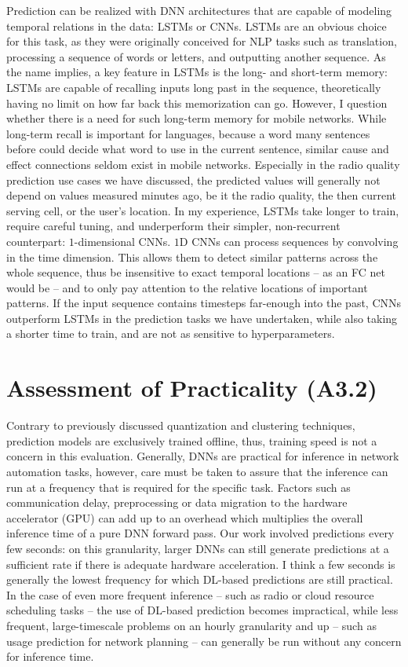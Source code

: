 		Prediction can be realized with \ac{DNN} architectures that are capable of modeling temporal relations in the data: \acp{LSTM} or \acp{CNN}.
		\acp{LSTM} are an obvious choice for this task, as they were originally conceived for \ac{NLP} tasks such as translation, processing a sequence of words or letters, and outputting another sequence.
		As the name implies, a key feature in \acp{LSTM} is the long- and short-term memory: \acp{LSTM} are capable of recalling inputs long past in the sequence, theoretically having no limit on how far back this memorization can go.
		However, I question whether there is a need for such long-term memory for mobile networks.
		While long-term recall is important for languages, because a word many sentences before could decide what word to use in the current sentence, similar cause and effect connections seldom exist in mobile networks.
		Especially in the radio quality prediction use cases we have discussed, the predicted values will generally not depend on values measured minutes ago, be it the radio quality, the then current serving cell, or the user's location.
		In my experience, \acp{LSTM} take longer to train, require careful tuning, and underperform their simpler, non-recurrent counterpart: $1$-dimensional \acp{CNN}.	
		$1$D \acp{CNN} can process sequences by convolving in the time dimension.
		This allows them to detect similar patterns across the whole sequence, thus be insensitive to exact temporal locations -- as an \ac{FC} net would be -- and to only pay attention to the relative locations of important patterns.
		If the input sequence contains timesteps far-enough into the past, \acp{CNN} outperform \acp{LSTM} in the prediction tasks we have undertaken, while also taking a shorter time to train, and are not as sensitive to hyperparameters.
		
	\section{Assessment of Practicality (A3.2)}
		
		Contrary to previously discussed quantization and clustering techniques, prediction models are exclusively trained offline, thus, training speed is not a concern in this evaluation. 
		Generally, \acp{DNN} are practical for inference in network automation tasks, however, care must be taken to assure that the inference can run at a frequency that is required for the specific task.
		Factors such as communication delay, preprocessing or data migration to the hardware accelerator (\ac{GPU}) can add up to an overhead which multiplies the overall inference time of a pure \ac{DNN} forward pass.
		Our work involved predictions every few seconds: on this granularity, larger \acp{DNN} can still generate predictions at a sufficient rate if there is adequate hardware acceleration.
		I think a few seconds is generally the lowest frequency for which \ac{DL}-based predictions are still practical.
		In the case of even more frequent inference -- such as radio or cloud resource scheduling tasks -- the use of \ac{DL}-based prediction becomes impractical, while less frequent, large-timescale problems on an hourly granularity and up -- such as usage prediction for network planning -- can generally be run without any concern for inference time.
		
